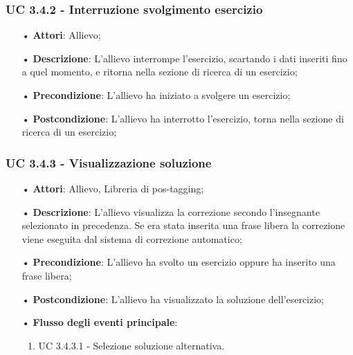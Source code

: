 \subsubsection{UC 3.4.2 - Interruzione svolgimento esercizio}
\begin{itemize}
\item[•]\textbf{Attori}: Allievo;
\item[•]\textbf{Descrizione}: L’allievo interrompe l’esercizio, scartando i dati inseriti fino a quel momento, e ritorna nella sezione di ricerca di un esercizio;
\item[•]\textbf{Precondizione}: L’allievo ha iniziato a svolgere un esercizio;
\item[•]\textbf{Postcondizione}: L’allievo ha interrotto l’esercizio, torna nella sezione di ricerca di un esercizio;
\end{itemize}

\subsubsection{UC 3.4.3 - Visualizzazione soluzione}
\begin{itemize}
\item[•]\textbf{Attori}: Allievo, Libreria di pos-tagging;
\item[•]\textbf{Descrizione}: L’allievo visualizza la correzione secondo l’insegnante selezionato in precedenza. Se era stata inserita una frase libera la correzione viene eseguita dal sistema di correzione automatico;
\item[•]\textbf{Precondizione}: L’allievo ha svolto un esercizio oppure ha inserito una frase libera;
\item[•]\textbf{Postcondizione}: L’allievo ha visualizzato la soluzione dell’esercizio;
\item[•]\textbf{Flusso degli eventi principale}:
\begin{enumerate}
\item UC 3.4.3.1 - Selezione soluzione alternativa.
\end{enumerate}
\end{itemize}

